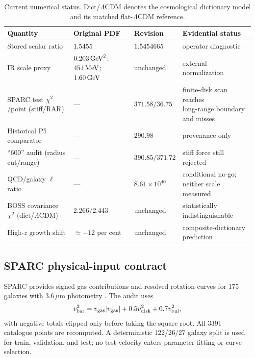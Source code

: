 \documentclass[10pt]{article}
\newcommand{\LCDM}{\Lambda\mathrm{CDM}}
\begin{document}
\begin{table}
 \centering
 \caption{Current numerical status.  Dict/$\LCDM$ denotes the cosmological
 dictionary model and its matched flat-$\LCDM$ reference.}
 \label{tab:preservation}
 \begin{tabular}{@{}llll@{}}
  \toprule
  Quantity & Original PDF & Revision & Evidential status\\
  \midrule
  Stored scalar ratio & $1.5455$ & $1.5454665$ & operator diagnostic\\
  IR scale proxy & $0.203\,{\rm GeV}^2$; $451\,{\rm MeV}$; $1.60\,{\rm GeV}$
    & unchanged & external normalization\\
  SPARC test $\chi^2$/point (stiff/RAR) & --- & $371.58/36.75$
    & \shortstack[l]{finite-disk scan reaches\\long-range boundary and misses}\\
  Historical P5 comparator & --- & $290.98$ & provenance only\\
  ``600'' audit (radius cut/range) & --- & $390.85/371.72$
    & stiff force still rejected\\
  QCD/galaxy $\ell$ ratio & --- & $8.61\times10^{40}$
    & \shortstack[l]{conditional no-go;\\neither scale measured}\\
  BOSS covariance $\chi^2$ (dict/$\LCDM$) & $2.266/2.443$ & unchanged
    & statistically indistinguishable\\
  High-$z$ growth shift & $\simeq-12$ per cent & unchanged
    & composite-dictionary prediction\\
  \bottomrule
 \end{tabular}
\end{table}

\subsection{SPARC physical-input contract}

SPARC provides signed gas contributions and resolved rotation curves for 175
galaxies with $3.6\,\mu$m photometry \citep{Lelli2016}.  The audit uses
\begin{equation}
 v_{\rm bar}^2=v_{\rm gas}|v_{\rm gas}|+0.5v_{\rm disk}^2
 +0.7v_{\rm bul}^2,
 \label{eq:repairedvbar}
\end{equation}
with negative totals clipped only before taking the square root.  All 3391
catalogue points are recomputed.  A deterministic 122/26/27 galaxy split is
used for train, validation, and test; no test velocity enters parameter fitting
or curve selection.
\end{document}
